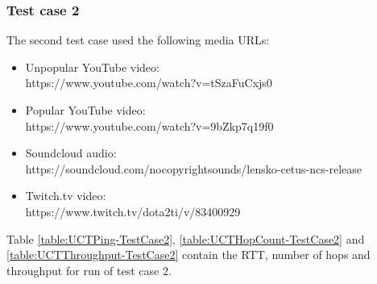 \documentclass{sig-alternate-05-2015}
\begin{document}
\begin{table}
	\centering
	\caption{Throughput using UCT network (KB/s) - Test 1}
	\label{table:UCTThroughput-TestCase1}
\end{table}

\subsubsection{Test case 2}
The second test case used the following media URLs:
\begin{itemize}
	\item Unpopular YouTube video: \\ 
	https://www.youtube.com/watch?v=tSzaFuCxjs0
	\item Popular YouTube video: \\
	https://www.youtube.com/watch?v=9bZkp7q19f0
	\item Soundcloud audio: \\ https://soundcloud.com/nocopyrightsounds/lensko-cetus-ncs-release
	\item Twitch.tv video: \\ https://www.twitch.tv/dota2ti/v/83400929
\end{itemize}
Table \ref{table:UCTPing-TestCase2}, \ref{table:UCTHopCount-TestCase2} and \ref{table:UCTThroughput-TestCase2} contain the RTT, number of hops and throughput for run of test case 2.
\end{document}
